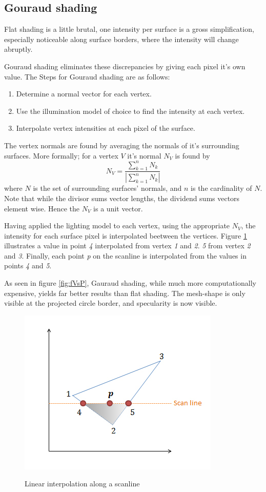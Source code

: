 \subsection{Gouraud shading}
Flat shading is a little brutal, one intensity per surface is a gross
simplification, especially noticeable along surface borders, where
the intensity will change abruptly.

Gouraud shading eliminates these discrepancies by giving each pixel it's own
value. The Steps for Gouraud shading are as follows:
\begin{enumerate}
	\item Determine a normal vector for each vertex.
	\item Use the illumination model of choice to find the intensity at each
	vertex.
	\item Interpolate vertex intensities at each pixel of the surface.
\end{enumerate}

The vertex normals are found by averaging the normals of it's surrounding
surfaces. More formally; for a vertex $V$ it's normal $N_{V}$ is found by
$$N_{V} = \frac{\sum_{k=1}^{n} N_{k}} {|\sum_{k=1}^{n} N_{k}|}$$
where $N$ is the set of surrounding surfaces' normals, and $n$ is the
cardinality of $N$. Note that while the divisor sums vector lengths, the
dividend sums vectors element wise. Hence the $N_{V}$ is a unit vector.



Having applied the lighting model to each vertex, using the appropriate
$N_{V}$, the intensity for each surface pixel is interpolated beetween the
vertices. Figure \ref{fig:gInt} illustrates a value in point \emph{4}
interpolated from vertex \emph{1} and \emph{2}. \emph{5} from vertex \emph{2}
and \emph{3}. Finally, each point \emph{p} on the scanline is interpolated from
the values in points \emph{4} and \emph{5}.

As seen in figure \ref{fig:fVsP}, Gauraud shading, while much more
computationally expensive, yields far better results than flat shading.
The mesh-shape is only visible at the projected circle border, and specularity
is now visible.

\begin{figure}[thbp]
	\centering
	\scalebox{0.5}
	{\includegraphics{pics/gouraudInterpolation.png}}
	\caption{Linear interpolation along a scanline}
	\label{fig:gInt}
\end{figure}

